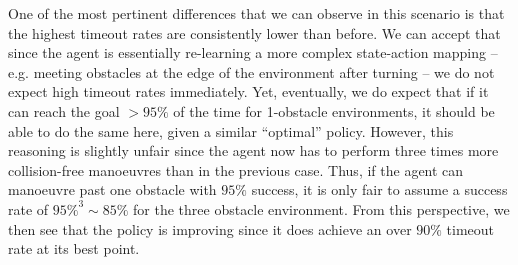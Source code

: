 One of the most pertinent differences that we can observe in this scenario is that the highest timeout rates are consistently lower than before. We can accept that since the agent is essentially re-learning a more complex state-action mapping -- e.g. meeting obstacles at the edge of the environment after turning -- we do not expect high timeout rates immediately. Yet, eventually, we do expect that if it can reach the goal $>95\%$ of the time for 1-obstacle environments, it should be able to do the same here, given a similar ``optimal'' policy. 
However, this reasoning is slightly unfair since the agent now has to perform three times more collision-free manoeuvres than in the previous case. Thus, if the agent can manoeuvre past one obstacle with $95\%$ success, it is only fair to assume a success rate of $95\%^3 \sim 85\%$ for the three obstacle environment.
From this perspective, we then see that the policy is improving since it does achieve an over $90\%$ timeout rate at its best point. 

